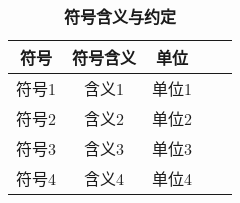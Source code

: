\documentclass[UTF8]{report}
\theoremstyle{MyLineTheoremStyle} %
\theoremstyle{MyBlockTheoremStyle} %
\theoremstyle{MySubsubsectionStyle} %
\begin{document}
\begin{table}[H]
   \centering
   \caption{\textbf{符号含义与约定}}
   \label{tab:waterpump}
   \begin{tabular}{ccccc}
   \toprule
   符号 & 符号含义& 单位\\
   \midrule
   符号1& 含义1& 单位1\\
   符号2& 含义2& 单位2\\
   符号3& 含义3& 单位3\\
   符号4& 含义4& 单位4\\
   \bottomrule
   \end{tabular}
\end{table}






















\nocite{*}

\thispagestyle{fancy} 






\end{document}

